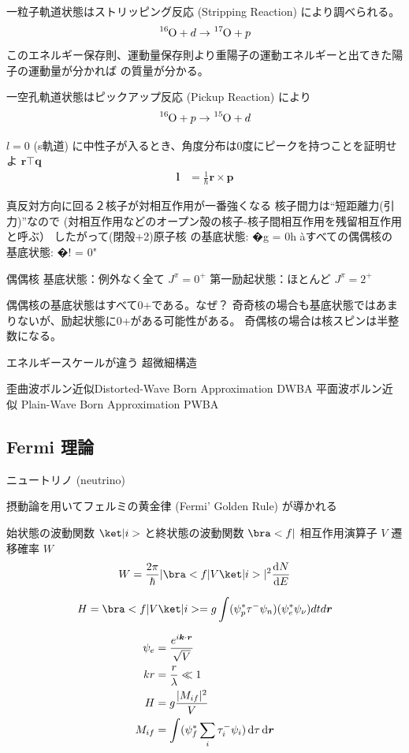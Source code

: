 \documentclass[uplatex,dvipdfmx,a4paper,11pt]{jlreq}
\newcommand{\rr}{\bm{r}}
\newcommand{\kk}{\bm{k}}
\newcommand{\pp}{\bm{p}}
\numberwithin{equation}{section}
\theoremstyle{definition}
\begin{document}
⼀粒⼦軌道状態はストリッピング反応 (Stripping Reaction) により調べられる。
\begin{align}
  \ce{^16O} + d \to \ce{^17O} + p
\end{align}
このエネルギー保存則、運動量保存則より重陽子の運動エネルギーと出てきた陽子の運動量が分かれば  の質量が分かる。

⼀空孔軌道状態はピックアップ反応 (Pickup Reaction) により
\begin{align}
  \ce{^16O} + p \to \ce{^15O} + d
\end{align}


$l = 0$ (s軌道) に中性⼦が⼊るとき、⾓度分布は0度にピークを持つことを証明せよ
$\rr\top \bm{q}$
\begin{align}
  \bm{l} & = \frac{1}{\hbar}\rr\times\pp
\end{align}

真反対⽅向に回る２核⼦が対相互作⽤が⼀番強くなる
核⼦間⼒は“短距離⼒(引⼒)”なので
(対相互作⽤などのオープン殻の核⼦-核⼦間相互作⽤を残留相互作⽤と呼ぶ）
したがって(閉殻+2)原⼦核
の基底状態: �g = 0h
àすべての偶偶核の基底状態: �! = 0"

偶偶核
基底状態：例外なく全て $J^\pi = 0^+$
第⼀励起状態：ほとんど $J^\pi = 2^+$

偶偶核の基底状態はすべて0+である。なぜ？
奇奇核の場合も基底状態ではあまりないが、励起状態に0+がある可能性がある。
奇偶核の場合は核スピンは半整数になる。

エネルギースケールが違う
超微細構造

歪曲波ボルン近似Distorted-Wave Born Approximation DWBA
平⾯波ボルン近似 Plain-Wave Born Approximation PWBA

\subsection{Fermi 理論}
ニュートリノ (neutrino)

摂動論を用いてフェルミの黄金律 (Fermi' Golden Rule) が導かれる

始状態の波動関数 $\ket|i>$ と終状態の波動関数 $\bra<f|$ 相互作用演算子 $V$
遷移確率 $W$
\begin{align}
  W = \frac{2\pi}{\hbar}|\bra<f|V\ket|i>|^2\diff{N}{E}
\end{align}

\begin{align}
  H = \bra<f|V\ket|i> = g\int(\psi_p^*\tau^-\psi_n)(\psi_e^*\psi_\nu)dt d\rr
\end{align}

\begin{align}
  \psi_e & = \frac{e^{i\kk\cdot\rr}}{\sqrt{V}}                   \\
  kr     & = \frac{r}{\lambda} \ll 1                             \\
  H      & = g\frac{|M_{if}|^2}{V}                               \\
  M_{if} & = \int(\psi_f^*\sum_i\tau_i^-\psi_i)\dl{\tau}\dl{\rr}
\end{align}
\end{document}
